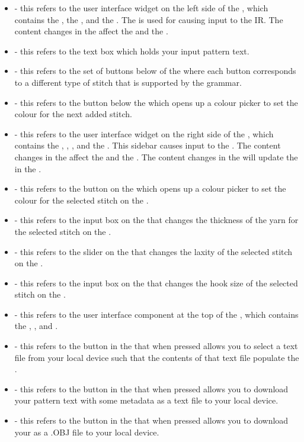 \documentclass[main.tex]{subfiles}
\begin{document}
\begin{itemize}
\item \PatSidebar* - this refers to the user interface widget on the left side of the \CRW, which contains the \PTI, the \ASBs, and the \NCSB. The \PatSidebar{} is used for causing input to the IR. The content changes in the \PatSidebar{} affect the \RM{} and the \CRW.
\item \PTI* - this refers to the text box which holds your input pattern text.
\item \ASBs* - this refers to the set of buttons below of the \PTI{} where each button corresponds to a different type of stitch that is supported by the grammar.
\item \NCSB* - this refers to the button below the \ASBs{} which opens up a colour picker to set the colour for the next added stitch.
\item \PropSidebar* - this refers to the user interface widget on the right side of the \CRW, which contains the \YCP, \YTS, \SLS, and the \HSS. This sidebar causes input to the \IR. The content changes in the \PropSidebar{} affect the \RM{} and the \CRW. The content changes in the \PropSidebar{} will update the \PTI{} in the \PatSidebar{}.
\item \YCP* - this refers to the button on the \PropSidebar{} which opens up a colour picker to set the colour for the selected stitch on the \RM.
\item \YTS* - this refers to the input box on the \PropSidebar{} that changes the thickness of the yarn for the selected stitch on the \RM.
\item \SLS* - this refers to the slider on the \PropSidebar{} that changes the laxity of the selected stitch on the \RM.
\item \HSS* - this refers to the input box on the \PropSidebar{} that changes the hook size of the selected stitch on the \RM.
\item \MenuBar* - this refers to the user interface component at the top of the \CRW, which contains the \UB, \DB, and \EB.
\item \UB* - this refers to the button in the \MenuBar{} that when pressed allows you to select a text file from your local device such that the contents of that text file populate the \PTI.
\item \DB* - this refers to the button in the \MenuBar{} that when pressed allows you to download your pattern text with some metadata as a text file to your local device.
\item \EB* - this refers to the button in the \MenuBar{} that when pressed allows you to download your \RM{} as a .OBJ file to your local device.

\end{itemize}
\end{document}
